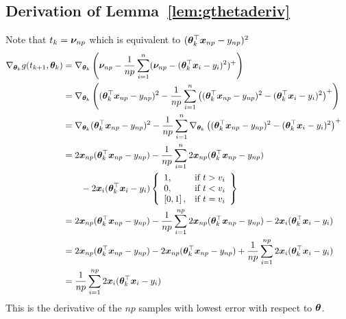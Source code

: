 \documentclass{article} %
\begin{document}
\begin{appendices}
	\subsection{Derivation of Lemma~\ref{lem:gthetaderiv}}
	\label{app:gthetaderiv}
		Note that $t_k = {\bm{\nu}}_{np}$ which is equivalent to $({\bm{\theta}}_k^\top{\bm{x}}_{np} - y_{np})^2$
		\begin{align}
			\nabla_{{\bm{\theta}}_k} g(t_{k+1},{\bm{\theta}}_k) &= \nabla_{{\bm{\theta}}_k}\left({\bm{\nu}}_{np} - \frac{1}{np}\sum_{i=1}^n({\bm{\nu}}_{np} - ({\bm{\theta}}_k^\top{\bm{x}}_i - y_i)^2)^+\right) &&\\
			&= \nabla_{{\bm{\theta}}_k}\left(({\bm{\theta}}_k^\top{\bm{x}}_{np}-y_{np})^2 - \frac{1}{np}\sum_{i=1}^n\left(({\bm{\theta}}_k^\top{\bm{x}}_{np} - y_{np})^2 - ({\bm{\theta}}_k^\top{\bm{x}}_i - y_i)^2\right)^+\right) &&\\
			&= \nabla_{{\bm{\theta}}_k}({\bm{\theta}}_k^\top{\bm{x}}_{np}-y_{np})^2 - \frac{1}{np}\sum_{i=1}^n\nabla_{{\bm{\theta}}_k}\left(({\bm{\theta}}_k^\top{\bm{x}}_{np} - y_{np})^2 - ({\bm{\theta}}_k^\top{\bm{x}}_i - y_i)^2\right)^+ &&\\				
			&= 2{\bm{x}}_{np}({\bm{\theta}}_k^\top{\bm{x}}_{np} - y_{np}) -\frac{1}{np}\sum_{i=1}^{n}2{\bm{x}}_{np}({\bm{\theta}}_k^\top{\bm{x}}_{np} - y_{np}) \notag\\ &\qquad-2{\bm{x}}_i({\bm{\theta}}_k^\top{\bm{x}}_i - y_i) \left\{
			\begin{array}{lr}
				1, & \text{if } t > v_i\\
				0, & \text{if } t < v_i \\
				\left[0,1\right], & \text{if } t = v_i \\
			\end{array} \right\} &&\\
			&= 2{\bm{x}}_{np}({\bm{\theta}}_k^\top{\bm{x}}_{np} - y_{np}) -\frac{1}{np}\sum_{i=1}^{np}2{\bm{x}}_{np}({\bm{\theta}}_k^\top{\bm{x}}_{np} - y_{np}) -2{\bm{x}}_i({\bm{\theta}}_k^\top{\bm{x}}_i - y_i) &&\\	
			&= 2{\bm{x}}_{np}({\bm{\theta}}_k^\top{\bm{x}}_{np} - y_{np}) - 2{\bm{x}}_{np}({\bm{\theta}}_k^\top{\bm{x}}_{np} - y_{np}) + \frac{1}{np}\sum_{i=1}^{np}2{\bm{x}}_i({\bm{\theta}}_k^\top{\bm{x}}_i - y_i) &&\\
			&= \frac{1}{np}\sum_{i=1}^{np}2{\bm{x}}_i({\bm{\theta}}_k^\top{\bm{x}}_i - y_i)&&
		\end{align}
		This is the derivative of the $np$ samples with lowest error with respect to ${\bm{\theta}}$.


\end{appendices}
\end{document}

